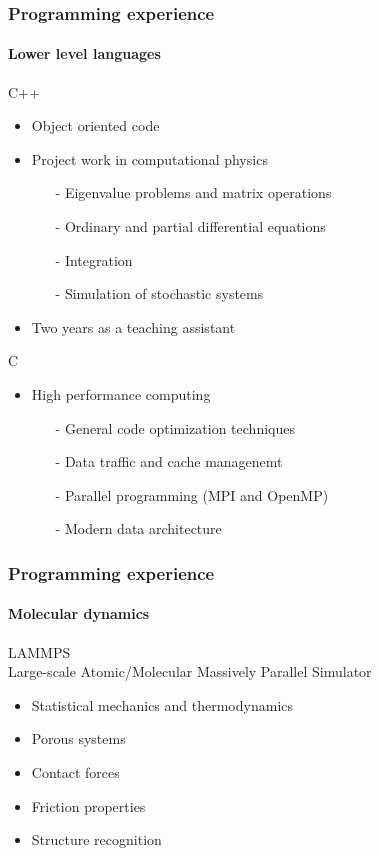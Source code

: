 \documentclass[
	10pt, %
]{beamer}
\begin{document}
\begin{frame}
	\frametitle{Programming experience}
	\framesubtitle{Lower level languages}

	{\large C++} 
	\begin{itemize}
		\item Object oriented code
		\item Project work in computational physics
		\begin{itemize}
			\item [-] Eigenvalue problems and matrix operations
			\item [-] Ordinary and partial differential equations
			\item [-] Integration 
			\item [-] Simulation of stochastic systems
		\end{itemize}
		\item Two years as a teaching assistant
	\end{itemize}


	{\large C} 
	\begin{itemize}
		\item High performance computing 
		\begin{itemize}
			\item [-] General code optimization techniques
			\item [-] Data traffic and cache managenemt
			\item [-] Parallel programming (MPI and OpenMP)
			\item [-] Modern data architecture
		\end{itemize}
	\end{itemize}

\end{frame}


\begin{frame}
	\frametitle{Programming experience}
	\framesubtitle{Molecular dynamics}

	{\large LAMMPS} \\
	Large-scale Atomic/Molecular Massively Parallel Simulator
	\begin{itemize}
		\item Statistical mechanics and thermodynamics
		\item Porous systems 
		\item Contact forces
		\item Friction properties
		\item Structure recognition
	\end{itemize}


\end{frame}
\end{document}
